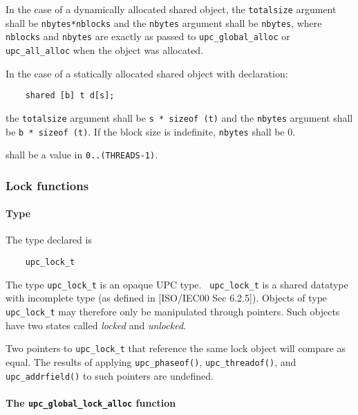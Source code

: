 \np In the case of a dynamically allocated shared object,
    the {\tt totalsize} argument shall be {\tt nbytes*nblocks} and the {\tt nbytes}
    argument shall be {\tt nbytes}, where {\tt nblocks} and {\tt nbytes} are exactly as
    passed to {\tt upc\_global\_alloc} or {\tt upc\_all\_alloc} when the 
    object was allocated.

\np In the case of a statically allocated shared object
    with declaration:

\begin{verbatim}
    shared [b] t d[s];
\end{verbatim}   

    the {\tt totalsize} argument shall be {\tt s * sizeof (t)} and the
    {\tt nbytes} argument shall be {\tt b * sizeof (t)}.  If the block
    size is indefinite, {\tt nbytes} shall be 0.
        
 shall be a value in {\tt 0..(THREADS-1)}.

\subsubsection{Lock functions}
\label{upc_lock}

\paragraph{Type}

\npf The type declared is 

\begin{verbatim}
    upc_lock_t 
\end{verbatim}

\np The type {\tt upc\_lock\_t} is an opaque UPC type. {\tt
    upc\_lock\_t} is a shared datatype with incomplete type (as
    defined in [ISO/IEC00 Sec 6.2.5]).  Objects of type {\tt
    upc\_lock\_t} may therefore only be manipulated through pointers.
    Such objects have two states called {\em locked} and {\em unlocked}.

\np Two pointers to {\tt upc\_lock\_t} that reference the same lock object will
    compare as equal.  The results of applying {\tt upc\_phaseof()},
     {\tt upc\_threadof()}, and {\tt upc\_addrfield()} to such pointers
     are undefined.
\paragraph{The {\tt upc\_global\_lock\_alloc} function}

